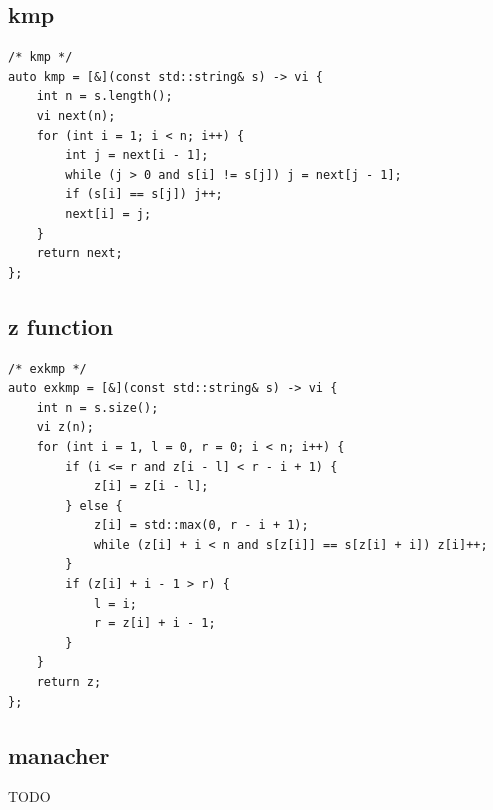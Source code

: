 \documentclass[UTF8, a4paper, titlepage, twoside]{ctexart}
\begin{document}
\subsection{ kmp }
\begin{lstlisting}[style=cpp]
/* kmp */
auto kmp = [&](const std::string& s) -> vi {
    int n = s.length();
    vi next(n);
    for (int i = 1; i < n; i++) {
        int j = next[i - 1];
        while (j > 0 and s[i] != s[j]) j = next[j - 1];
        if (s[i] == s[j]) j++;
        next[i] = j;
    }
    return next;
};
\end{lstlisting}

\subsection{ z function }
\begin{lstlisting}[style=cpp]
/* exkmp */
auto exkmp = [&](const std::string& s) -> vi {
    int n = s.size();
    vi z(n);
    for (int i = 1, l = 0, r = 0; i < n; i++) {
        if (i <= r and z[i - l] < r - i + 1) {
            z[i] = z[i - l];
        } else {
            z[i] = std::max(0, r - i + 1);
            while (z[i] + i < n and s[z[i]] == s[z[i] + i]) z[i]++;
        }
        if (z[i] + i - 1 > r) {
            l = i;
            r = z[i] + i - 1;
        }
    }
    return z;
};
\end{lstlisting}

\subsection{ manacher }

TODO
\end{document}
